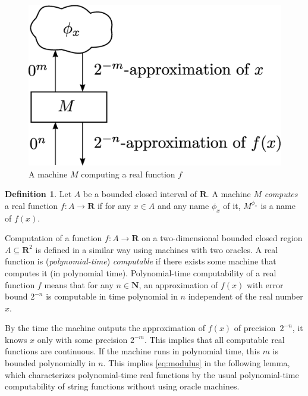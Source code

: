 \documentclass[12pt,a4paper]{article}
\theoremstyle{definition}
\newtheorem{definition}[theorem]{Definition}
\theoremstyle{remark}
\newcommand{\R}{\mathbf R}
\newcommand{\N}{\mathbf N}
\begin{document}
\begin{figure}
 \begin{center}
  \includegraphics[height=0.17\textheight]{image/model-of-function.eps}
 \end{center}
 \caption{A machine $M$ computing a real function $f$}
 \label{fig:model-of-function}
\end{figure}

\begin{definition}
Let $A$ be a bounded closed interval of\/ $\R$.
A machine $M$ \emph{computes} a real function $f \colon A \to \R$ 
if for any $x \in A$ and any name $\phi_x$ of it,
$M^{\phi_x}$ is a name of $f(x)$.
\end{definition}

Computation of a function $f \colon A \to \R$ on
a two-dimensional bounded closed region $A \subseteq \R ^2$ 
is defined in a similar way using machines with two oracles.
A real function is (\emph{polynomial-time}) \emph{computable} if there exists some machine that computes it (in polynomial time).
Polynomial-time computability of a real function $f$ means that
for any $n \in \N$, 
an approximation of $f(x)$ with error bound $2^{-n}$
is computable in time polynomial in $n$ 
independent of the real number $x$.

By the time the machine outputs the approximation of $f (x)$ of precision~$2 ^{-n}$, 
it knows $x$ only with some precision $2 ^{-m}$.
This implies that all computable real functions are continuous.
If the machine runs in polynomial time,
this $m$ is bounded polynomially in $n$.
This implies \eqref{eq:modulus} in the following lemma, 
which characterizes polynomial-time real functions
by the usual polynomial-time computability of string functions 
without using oracle machines. 
\end{document}
